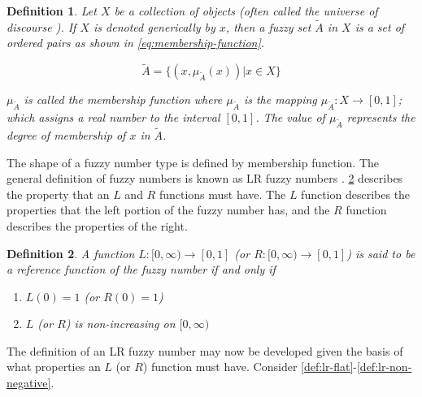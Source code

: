 \documentclass[ee,thesis]{usuthesis}
\newtheorem{definition}{Definition}[section]
\begin{document}
\begin{definition}
\label{def:membership-function}
Let \(X\) be a collection of objects (often called the universe of discourse \cite{bello-2019-fuzzy-activ}). If \(X\) is denoted
generically by \(x\), then a fuzzy set \(\tilde{A}\) in \(X\) is a set of ordered pairs as shown in \ref{eq:membership-function}.

\begin{equation}
\label{eq:membership-function}
\tilde{A} = \{(x, \mu_{\tilde{A}}(x))| x\in X\}
\end{equation}

\noindent
\(\mu_{\tilde{A}}\) is called the membership function where \(\mu_{\tilde{A}}\) is the mapping \(\mu_{\tilde{A}} : X \rightarrow
[0,1]\); which assigns a real number to the interval \([0,1]\). The value of \(\mu_{\tilde{A}}\) represents the degree of
membership of \(x\) in \(\tilde{A}\).
\end{definition}

The shape of a fuzzy number type is defined by membership function. The general definition of fuzzy numbers is known as
LR fuzzy numbers \cite{kaur-2016-introd-fuzzy,zimmermann-2001-fuzzy-set}. \ref{def:reference-function} describes the
property that an \(L\) and \(R\) functions must have. The \(L\) function describes the properties that the left portion of the
fuzzy number has, and the \(R\) function describes the properties of the right.

\begin{definition}
\label{def:reference-function}
A function \(L:[0,\infty) \rightarrow [0,1]\) (or \(R:[0,\infty) \rightarrow [0,1]\)) is said to be a reference function of the fuzzy number if and only
if

\begin{enumerate}
\item \(L(0) = 1\) (or \(R(0) = 1\))
\item \(L\) (or \(R\)) is non-increasing on \([0,\infty)\)
\end{enumerate}
\end{definition}

The definition of an LR fuzzy number may now be developed given the basis of what properties an \(L\) (or \(R\)) function
must have. Consider \ref{def:lr-flat}-\ref{def:lr-non-negative}.
\end{document}
